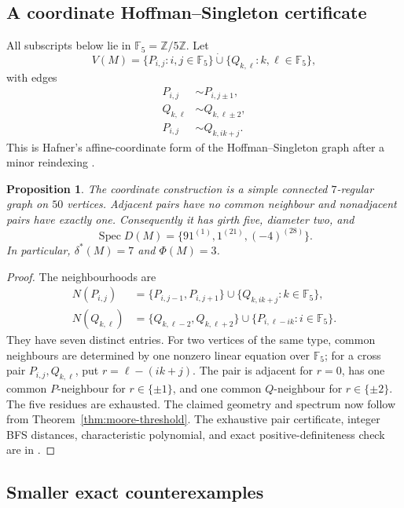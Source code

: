 \documentclass[a4paper,10pt,reqno]{amsart}
\theoremstyle{plain}
\newtheorem{proposition}[theorem]{Proposition}
\theoremstyle{definition}
\theoremstyle{remark}
\newcommand{\F}{\mathbb F_5}
\newcommand{\Spec}{\operatorname{Spec}}
\newcommand{\RepoTag}{v2.3.0}
\newcommand{\codefile}[1]{%
  \href{https://github.com/SamPetkov/wow284/blob/\RepoTag/#1}{\path{#1}}}
\begin{document}
\subsection{A coordinate Hoffman--Singleton certificate}

All subscripts below lie in \(\F=\mathbb Z/5\mathbb Z\).  Let
\[
 V(M)=\{P_{i,j}:i,j\in\F\}\mathbin{\dot\cup}
      \{Q_{k,\ell}:k,\ell\in\F\},
\]
with edges
\begin{align*}
 P_{i,j}&\sim P_{i,j\pm1},\\
 Q_{k,\ell}&\sim Q_{k,\ell\pm2},\\
 P_{i,j}&\sim Q_{k,ik+j}.
\end{align*}
This is Hafner's affine-coordinate form of the Hoffman--Singleton graph after a
minor reindexing \cite{Hafner2003}.

\begin{proposition}\label{prop:hs-coordinate}
The coordinate construction is a simple connected \(7\)-regular graph on
\(50\) vertices.  Adjacent pairs have no common neighbour and nonadjacent pairs
have exactly one.  Consequently it has girth five, diameter two, and
\[
 \Spec D(M)=\{91^{(1)},1^{(21)},(-4)^{(28)}\}.
\]
In particular, \(\delta^*(M)=7\) and \(\Phi(M)=3\).
\end{proposition}

\begin{proof}
The neighbourhoods are
\begin{align*}
N(P_{i,j})&=\{P_{i,j-1},P_{i,j+1}\}
 \cup\{Q_{k,ik+j}:k\in\F\},\\
N(Q_{k,\ell})&=\{Q_{k,\ell-2},Q_{k,\ell+2}\}
 \cup\{P_{i,\ell-ik}:i\in\F\}.
\end{align*}
They have seven distinct entries.  For two vertices of the same type, common
neighbours are determined by one nonzero linear equation over \(\F\); for a
cross pair \(P_{i,j},Q_{k,\ell}\), put
\(r=\ell-(ik+j)\).  The pair is adjacent for \(r=0\), has one common
\(P\)-neighbour for \(r\in\{\pm1\}\), and one common \(Q\)-neighbour for
\(r\in\{\pm2\}\).  The five residues are exhausted.  The claimed geometry
and spectrum now follow from Theorem~\ref{thm:moore-threshold}.  The exhaustive
pair certificate, integer BFS distances, characteristic polynomial, and exact
positive-definiteness check are in \codefile{scripts/verify_exact.py}.
\end{proof}

\subsection{Smaller exact counterexamples}
\end{document}
